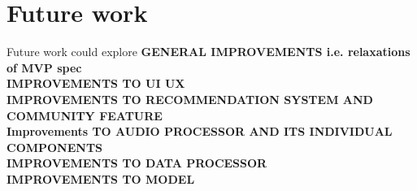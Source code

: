 \section{Future work}

Future work could explore
\textbf{GENERAL IMPROVEMENTS i.e. relaxations of MVP spec} \\
\textbf{IMPROVEMENTS TO UI UX} \\
\textbf{IMPROVEMENTS TO RECOMMENDATION SYSTEM AND COMMUNITY FEATURE}\\
\textbf{Improvements TO AUDIO PROCESSOR AND ITS INDIVIDUAL COMPONENTS}\\
\textbf{IMPROVEMENTS TO DATA PROCESSOR}\\
\textbf{IMPROVEMENTS TO MODEL}\\

